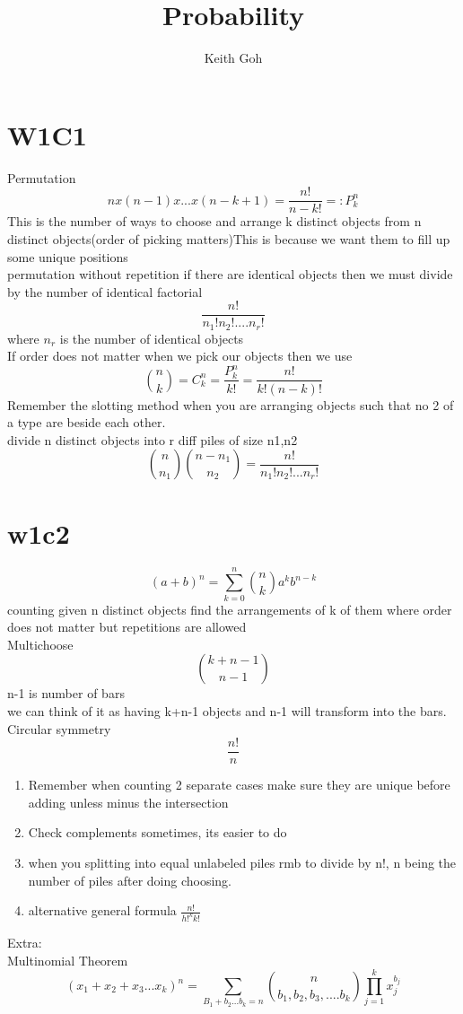 \documentclass{article}
\title{Probability}
\author{Keith Goh}
\begin{document}
\maketitle

\section{W1C1}
Permutation
$$
nx(n-1)x...x(n-k+1)=\frac{n!}{n-k!}=:P^n_k
$$
This is the number of ways to choose and arrange k distinct objects from n distinct objects(order of picking matters)This is because we want them to fill up some unique positions\\
permutation without repetition if there are identical objects then we must divide by the number of  identical factorial
$$
\frac{n!}{n_1!n_2!....n_r!}
$$
where $n_r$  is the number of identical objects \\
If order does not matter when we pick our objects then we use
$$
{n \choose k} = C^n_k=\frac{P^n_k}{k!}=\frac{n!}{k!(n-k)!}
$$
Remember the slotting method when you are arranging objects such that no 2 of a type are beside each other.\\
divide n distinct objects into r diff piles of size n1,n2
$$
{n \choose n_1}{n-n_1 \choose n_2}=\frac{n!}{n_1!n_2!...n_r!}
$$
\section{w1c2}
$$
(a+b)^n=\sum_{k=0}^n{n \choose k}a^kb^{n-k}
$$
counting given n distinct objects find the arrangements of k of them where order does not matter but repetitions are allowed\\
Multichoose
$$
{k+n-1 \choose n-1}
$$
n-1 is number of bars\\
we can think of it as having k+n-1 objects and n-1 will transform into the bars.\\
Circular symmetry
$$
\frac{n!}{n}
$$
\begin{enumerate}
  \item Remember when counting 2 separate cases make sure they are unique before adding unless minus the intersection
  \item Check complements sometimes, its easier to do
  \item when you splitting into equal unlabeled piles rmb to divide by n!, n being the number of piles after doing choosing.
  \item alternative general formula $\frac{n!}{h!^kk!}$
\end{enumerate}
Extra:\\
Multinomial Theorem
$$
(x_1+x_2+x_3...x_k)^n=\sum_{B_1+b_2...b_k=n}{n \choose b_1,b_2,b_3,....b_k}\prod_{j=1}^kx^{b_j}_j
$$
\end{document}
